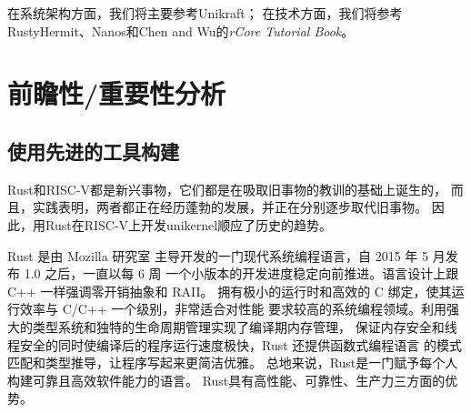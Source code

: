 \documentclass{../runikraft-report}
\begin{document}
在系统架构方面，我们将主要参考Unikraft；
在技术方面，我们将参考RustyHermit、Nanos和Chen and Wu的\textit{rCore Tutorial Book}\cite{bib:rcore-os}。

\section{前瞻性/重要性分析}

\subsection{使用先进的工具构建}

Rust和RISC-V都是新兴事物，它们都是在吸取旧事物的教训的基础上诞生的，
而且，实践表明，两者都正在经历蓬勃的发展，并正在分别逐步取代旧事物。
因此，用Rust在RISC-V上开发unikernel顺应了历史的趋势。

Rust 是由 Mozilla 研究室
主导开发的一门现代系统编程语言，自 2015 年 5 月发布 1.0 之后，一直以每 6 周
一个小版本的开发进度稳定向前推进。语言设计上跟 C++ 一样强调零开销抽象和 RAII。
拥有极小的运行时和高效的 C 绑定，使其运行效率与 C/C++ 一个级别，非常适合对性能
要求较高的系统编程领域。利用强大的类型系统和独特的生命周期管理实现了编译期内存管理，
保证内存安全和线程安全的同时使编译后的程序运行速度极快，Rust 还提供函数式编程语言
的模式匹配和类型推导，让程序写起来更简洁优雅。\cite{bib:2-why-rust}
总地来说，Rust是一门赋予每个人 构建可靠且高效软件能力的语言。\cite{bib:1-rust-lang}
Rust具有高性能、可靠性、生产力三方面的优势。
\end{document}

